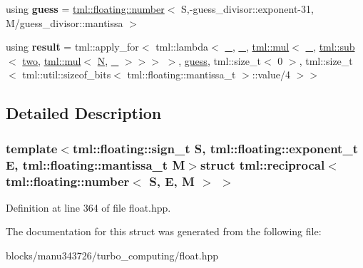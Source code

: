 \begin{DoxyCompactItemize}
\item 
\hypertarget{structtml_1_1reciprocal_3_01tml_1_1floating_1_1number_3_01_s_00_01_e_00_01_m_01_4_01_4_ac4e2b0db8bee612a06334934693b072c}{using {\bfseries guess} = \hyperlink{structtml_1_1floating_1_1number}{tml\+::floating\+::number}$<$ S,-\/guess\+\_\+divisor\+::exponent-\/31, M/guess\+\_\+divisor\+::mantissa $>$}\label{structtml_1_1reciprocal_3_01tml_1_1floating_1_1number_3_01_s_00_01_e_00_01_m_01_4_01_4_ac4e2b0db8bee612a06334934693b072c}

\item 
\hypertarget{structtml_1_1reciprocal_3_01tml_1_1floating_1_1number_3_01_s_00_01_e_00_01_m_01_4_01_4_a84713b83f70c7ec03def141c3f482aaf}{using {\bfseries result} = tml\+::apply\+\_\+for$<$ tml\+::lambda$<$ \hyperlink{structtml_1_1placeholder}{\+\_}, \hyperlink{structtml_1_1placeholder}{\+\_}, \hyperlink{structtml_1_1mul}{tml\+::mul}$<$ \hyperlink{structtml_1_1placeholder}{\+\_}, \hyperlink{structtml_1_1sub}{tml\+::sub}$<$ \hyperlink{structtml_1_1floating_1_1number}{two}, \hyperlink{structtml_1_1mul}{tml\+::mul}$<$ \hyperlink{structtml_1_1floating_1_1number}{N}, \hyperlink{structtml_1_1placeholder}{\+\_} $>$$>$$>$ $>$, \hyperlink{structtml_1_1floating_1_1number}{guess}, tml\+::size\+\_\+t$<$ 0 $>$, tml\+::size\+\_\+t$<$ tml\+::util\+::sizeof\+\_\+bits$<$ tml\+::floating\+::mantissa\+\_\+t $>$\+::value/4 $>$$>$}\label{structtml_1_1reciprocal_3_01tml_1_1floating_1_1number_3_01_s_00_01_e_00_01_m_01_4_01_4_a84713b83f70c7ec03def141c3f482aaf}

\end{DoxyCompactItemize}


\subsection{Detailed Description}
\subsubsection*{template$<$tml\+::floating\+::sign\+\_\+t S, tml\+::floating\+::exponent\+\_\+t E, tml\+::floating\+::mantissa\+\_\+t M$>$struct tml\+::reciprocal$<$ tml\+::floating\+::number$<$ S, E, M $>$ $>$}



Definition at line 364 of file float.\+hpp.



The documentation for this struct was generated from the following file\+:\begin{DoxyCompactItemize}
\item 
blocks/manu343726/turbo\+\_\+computing/float.\+hpp\end{DoxyCompactItemize}

